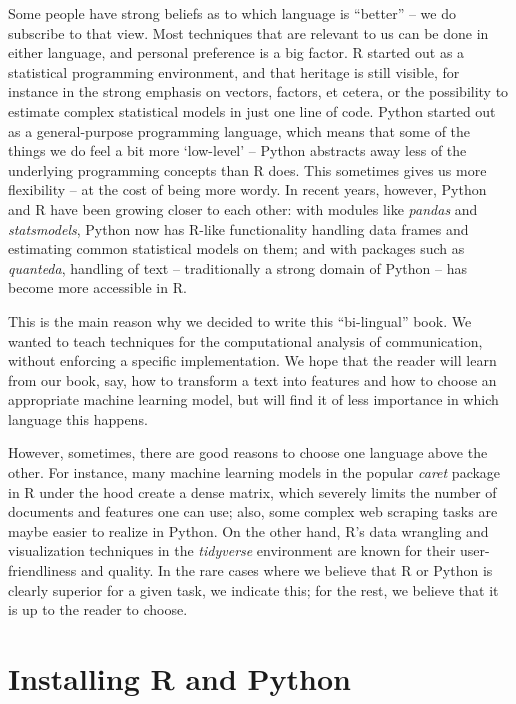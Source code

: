 Some people have strong beliefs as to which language is ``better'' -- we 
do subscribe to that view. Most techniques that are relevant to us can be
done in either language, and personal preference is a big factor. R
started out as a statistical programming environment, and that
heritage is still visible, for instance in the strong emphasis on
vectors, factors, et cetera, or the possibility to estimate complex
statistical models in just one line of code. Python started out as a
general-purpose programming language, which means that some of the things we
do feel a bit more `low-level' -- Python abstracts away less of the
underlying programming concepts than R does. This sometimes gives us
more flexibility -- at the cost of being more wordy.
In recent years, however, Python and R have been
growing closer to each other: with modules like \emph{pandas} and
\emph{statsmodels}, Python now has R-like functionality handling data
frames and estimating common statistical models on them; and with
packages such as \emph{quanteda}, handling of text -- traditionally a
strong domain of Python -- has become more accessible in R.

This is the main reason why we decided to write this ``bi-lingual''
book. We wanted to teach techniques for the computational analysis of
communication, without enforcing a specific implementation. We hope
that the reader will learn from our book, say, how to transform a text
into features and how to choose an appropriate machine learning model,
but will find it of less importance in which language this happens.

However, sometimes, there are good reasons to choose one language above
the other. For instance, many machine learning models in the popular \emph{caret} package in R under the
hood create a dense matrix, which severely limits the number of
documents and features one can use; also, some complex web scraping
tasks are maybe easier to realize in Python. On the other hand, R's
data wrangling and visualization techniques in the \emph{tidyverse}
environment are known for their user-friendliness and quality.  In the
rare cases where we believe that R or Python is clearly superior for a
given task, we indicate this; for the rest, we believe that it is up to
the reader to choose.

%


\section{Installing R and Python}
\label{sec:installing}

